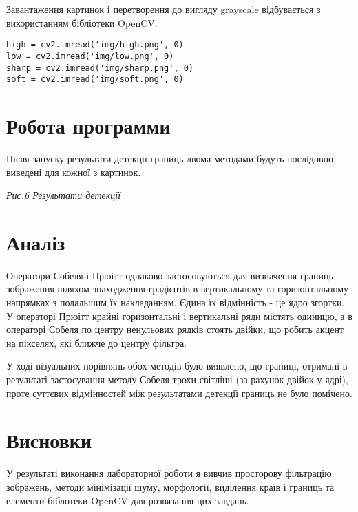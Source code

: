 \documentclass{/home/alx/Documents/LaTex/nulp}
\begin{document}
Завантаження картинок і перетворення до вигляду grayscale відбувається з використанням бібліотеки OpenCV.

\begin{verbatim}
high = cv2.imread('img/high.png', 0)
low = cv2.imread('img/low.png', 0)
sharp = cv2.imread('img/sharp.png', 0)
soft = cv2.imread('img/soft.png', 0)
\end{verbatim}

\section*{Робота программи}

Після запуску результати детекції границь двома методами будуть послідовно виведені для кожної з картинок.

\begin{center}

\textit{Рис.6 Результати детекції}
\end{center}

\section*{Аналіз}

Оператори Собеля і Прюітт однаково застосовуються для визначення границь зображення шляхом знаходження градієнтів в вертикальному та горизонтальному напрямках з подальшим їх накладанням. Єдина їх відмінність - це ядро згортки. У операторі Прюітт крайні горизонтальні і вертикальні ряди містять одиницю, а в операторі Собеля по центру ненульових рядків стоять двійки, що робить акцент на пікселях, які ближче до центру фільтра.

У ході візуальних порівнянь обох методів було виявлено, що границі, отримані в результаті застосування методу Собеля трохи світліші (за рахунок двійок у ядрі), проте суттєвих відмінностей між результатами детекції границь не було помічено.

\section*{Висновки}
У результаті виконання лабораторної роботи я вивчив просторову фільтрацію зображень, методи мінімізації шуму, морфології, виділення країв і границь та елементи біблотеки OpenCV для розвязання цих завдань.
\end{document}
